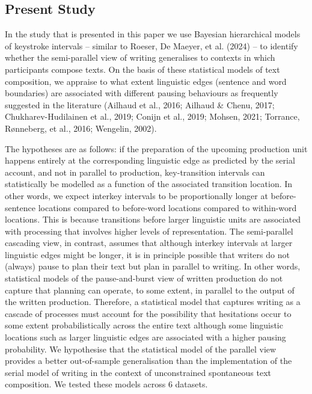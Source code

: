 \documentclass[
  man,floatsintext]{apa7}
\begin{document}
\hypertarget{present-study}{%
\subsection{Present Study}\label{present-study}}

In the study that is presented in this paper we use Bayesian hierarchical models of keystroke intervals -- similar to Roeser, De Maeyer, et al. (2024) -- to identify whether the semi-parallel view of writing generalises to contexts in which participants compose texts. On the basis of these statistical models of text composition, we appraise to what extent linguistic edges (sentence and word boundaries) are associated with different pausing behaviours as frequently suggested in the literature (Ailhaud et al., 2016; Ailhaud \& Chenu, 2017; Chukharev-Hudilainen et al., 2019; Conijn et al., 2019; Mohsen, 2021; Torrance, Rønneberg, et al., 2016; Wengelin, 2002).

The hypotheses are as follows: if the preparation of the upcoming production unit happens entirely at the corresponding linguistic edge as predicted by the serial account, and not in parallel to production, key-transition intervals can statistically be modelled as a function of the associated transition location. In other words, we expect interkey intervals to be proportionally longer at before-sentence locations compared to before-word locations compared to within-word locations. This is because transitions before larger linguistic units are associated with processing that involves higher levels of representation. The semi-parallel cascading view, in contrast, assumes that although interkey intervals at larger linguistic edges might be longer, it is in principle possible that writers do not (always) pause to plan their text but plan in parallel to writing. In other words, statistical models of the pause-and-burst view of written production do not capture that planning can operate, to some extent, in parallel to the output of the written production. Therefore, a statistical model that captures writing as a cascade of processes must account for the possibility that hesitations occur to some extent probabilistically across the entire text although some linguistic locations such as larger linguistic edges are associated with a higher pausing probability. We hypothesise that the statistical model of the parallel view provides a better out-of-sample generalisation than the implementation of the serial model of writing in the context of unconstrained spontaneous text composition. We tested these models across 6 datasets.
\end{document}
